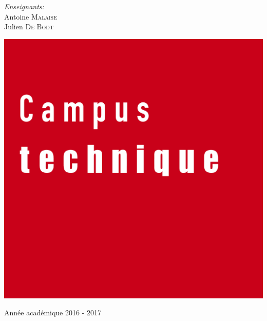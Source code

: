 \begin{center}
  \vspace{1.5cm}

  \begin{minipage}[t]{0.4 \textwidth}
    \begin{center} 
      \large \emph{Enseignants:} \\ 
      Antoine \textsc{Malaise} \\
      Julien \textsc{De Bodt}
    \end{center} 
  \end{minipage}

  \vspace{1cm}

  \includegraphics[scale=0.08]{textures/logo/technical.pdf}

  \vspace{0.5cm}

  Année académique 2016 - 2017
\end{center}

\thispagestyle{empty}
